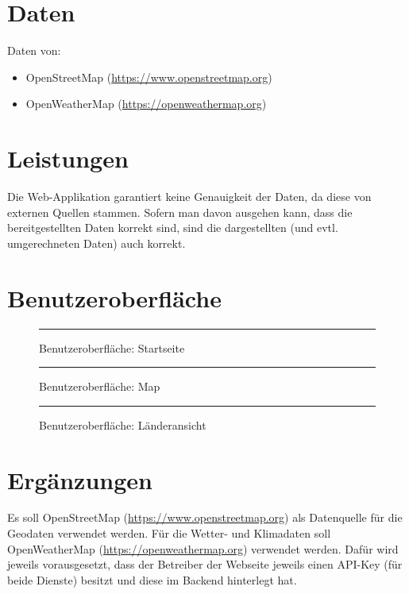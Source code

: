 \documentclass[a4paper]{scrreprt}
\begin{document}

\chapter{Daten}
Daten von:
\begin{itemize}
    \item OpenStreetMap (\url{https://www.openstreetmap.org})
    \item OpenWeatherMap (\url{https://openweathermap.org})
\end{itemize}

\chapter{Leistungen}
Die Web-Applikation garantiert keine Genauigkeit der Daten, da diese von externen Quellen stammen. Sofern man davon ausgehen kann, dass die bereitgestellten Daten korrekt sind, sind die dargestellten (und evtl. umgerechneten Daten) auch korrekt.

\chapter{Benutzeroberfläche}
\begin{figure}[ht]
  \centering
  \rule{8cm}{6cm}
  \caption{Benutzeroberfläche: Startseite}
\end{figure}
\begin{figure}[ht]
    \centering
    \rule{8cm}{6cm}
    \caption{Benutzeroberfläche: Map}
\end{figure}
\begin{figure}[ht]
    \centering
    \rule{8cm}{6cm}
    \caption{Benutzeroberfläche: Länderansicht}
\end{figure}


\chapter{Ergänzungen}
Es soll OpenStreetMap (\url{https://www.openstreetmap.org}) als Datenquelle für die Geodaten verwendet werden. Für die Wetter- und Klimadaten soll OpenWeatherMap (\url{https://openweathermap.org}) verwendet werden.
Dafür wird jeweils vorausgesetzt, dass der Betreiber der Webseite jeweils einen API-Key (für beide Dienste) besitzt und diese im Backend hinterlegt hat.
\end{document}
